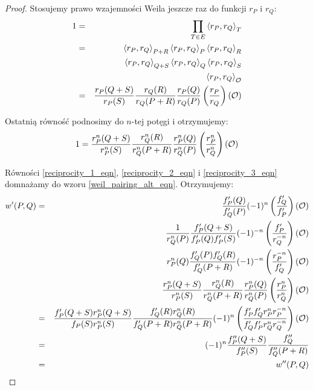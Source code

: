 \begin{proof}
\noindent
Stosujemy prawo wzajemności Weila jeszcze raz do funkcji $r_P$ i $r_Q$:
\begin{eqnarray}
1
& = & \prod_{T \in E} \left\langle r_P , r_Q \right\rangle_{T}
\nonumber \\
& = & \left\langle r_P , r_Q \right\rangle_{P+R}
      \left\langle r_P , r_Q \right\rangle_{P}
      \left\langle r_P , r_Q \right\rangle_{R}
\nonumber \\
&   & \left\langle r_P , r_Q \right\rangle_{Q+S}
      \left\langle r_P , r_Q \right\rangle_{Q}
      \left\langle r_P , r_Q \right\rangle_{S}
\nonumber \\
&   & \left\langle r_P , r_Q \right\rangle_{\mathcal{O}}
\nonumber \\
& = & \frac{r_P(Q+S)}{r_P(S)}
      \frac{r_Q(R)}{r_Q(P+R)}
      \frac{r_P(Q)}{r_Q(P)}
      \left(\frac{r_P}{r_Q}\right)(\mathcal{O})
\end{eqnarray}

\noindent
Ostatnią równość podnosimy do $n$-tej potęgi i otrzymujemy:
\begin{equation}\label{reciprocity_3_eqn}
1 =
\frac{r_P^n(Q+S)}{r_P^n(S)}
\frac{r_Q^n(R)}{r_Q^n(P+R)}
\frac{r_P^n(Q)}{r_Q^n(P)}
\left(\frac{r_P^n}{r_Q^n}\right)(\mathcal{O})
\end{equation}

\noindent
Równości
\ref{reciprocity_1_eqn}, \ref{reciprocity_2_eqn} i \ref{reciprocity_3_eqn}
domnażamy do wzoru \ref{weil_pairing_alt_eqn}.
Otrzymujemy:
\begin{eqnarray*}
w'(P,Q)
& = & \frac{f_P'(Q)}{f_Q'(P)}(-1)^n\left(\frac{f_Q'}{f_P'}\right)(\mathcal{O}) \\
&   & \frac{1}{r_Q^n(P)}\frac{f_P'(Q+S)}{f_P'(Q)f_P'(S)}
      (-1)^{-n}\left(\frac{f_P'}{r_Q^{-n}}\right)(\mathcal{O}) \\
&   & r_P^n(Q)\frac{f_Q'(P)f_Q'(R)}{f_Q'(P+R)}
      (-1)^{-n}\left(\frac{r_P^{-n}}{f_Q'}\right)(\mathcal{O}) \\
&   & \frac{r_P^n(Q+S)}{r_P^n(S)}
      \frac{r_Q^n(R)}{r_Q^n(P+R)}
      \frac{r_P^n(Q)}{r_Q^n(P)}
      \left(\frac{r_P^n}{r_Q^n}\right)(\mathcal{O}) \\
& = & \frac{f_P'(Q+S)r_P^n(Q+S)}{f_P(S)r_P^n(S)}
      \frac{f_Q'(R)r_Q^n(R)}{f_Q'(P+R)r_Q^n(P+R)}
      (-1)^n\left(
      \frac{f_P'f_Q'r_P^nr_P^{-n}}{f_Q'f_P'r_Q^nr_Q^{-n}}
      \right)(\mathcal{O}) \\
& = & (-1)^n\frac{f_P''(Q+S)}{f_P''(S)}
      \frac{f_Q''}{f_Q''(P+R)} \\
& = & w''(P,Q)
\end{eqnarray*}
\end{proof}
